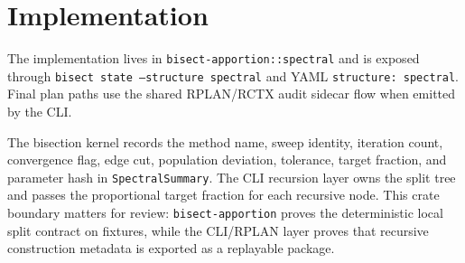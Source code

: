 \section{Implementation}

The implementation lives in \texttt{bisect-apportion::spectral} and is exposed
through \texttt{bisect state --structure spectral} and YAML
\texttt{structure: spectral}. Final plan paths use the shared RPLAN/RCTX audit
sidecar flow when emitted by the CLI.

The bisection kernel records the method name, sweep identity, iteration count,
convergence flag, edge cut, population deviation, tolerance, target fraction,
and parameter hash in \texttt{SpectralSummary}. The CLI recursion layer owns
the split tree and passes the proportional target fraction for each recursive
node. This crate boundary matters for review: \texttt{bisect-apportion} proves
the deterministic local split contract on fixtures, while the CLI/RPLAN layer
proves that recursive construction metadata is exported as a replayable package.
